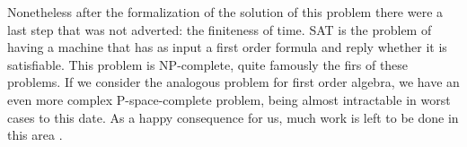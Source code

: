 Nonetheless after the formalization of the solution of this problem there were a last step that was not adverted: the finiteness of time. SAT is the problem of having a machine that has as input a first order formula and reply whether it is satisfiable. This problem is NP-complete, quite famously the firs of these problems\cite{cook1971complexity}. If we consider the analogous problem for first order algebra, we have an even more complex P-space-complete problem, being almost intractable in worst cases to this date. As a happy consequence for us, much work is left to be done in this area \cite{cook2006p}. 